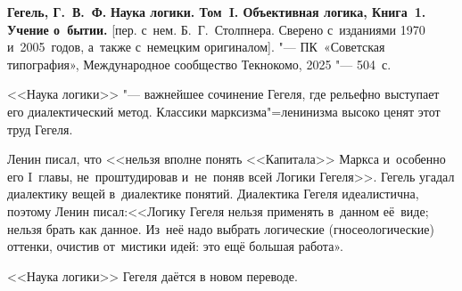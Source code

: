 \documentclass[a5paper, 10pt, twoside, onecolumn, openany]{memoir}
\begin{document}
\clearpage
\thispagestyle{bookoutput}
{\small
\noindent\textbf{Гегель, Г.~В.~Ф.}\newline
\textbf{Наука логики. Том~I. Объективная логика, Книга~1. Учение о~бытии.}
[пер. с~нем. Б.~Г.~Столпнера. Сверено с~изданиями 1970 и~2005~годов, а~также
с~немецким оригиналом]. "--- ПК~«Советская типография», Международное
сообщество Текнокомо, 2025 "--- 504~с.\vspace{2ex}

{\setlength\parskip{0mm}
<<Наука логики>> "--- важнейшее сочинение Гегеля, где рельефно выступает его
диалектический метод. Классики марксизма"=ленинизма высоко ценят этот труд
Гегеля.

Ленин писал, что <<нельзя вполне понять <<Капитала>> Маркса и~особенно его
I~главы, не~проштудировав и~не~поняв всей Логики Гегеля>>. Гегель угадал
диалектику вещей в~диалектике понятий. Диалектика Гегеля идеалистична, поэтому
Ленин писал:<<Логику Гегеля нельзя применять в~данном её~виде; нельзя брать как
данное. Из~неё надо выбрать логические (гносеологические) оттенки, очистив
от~мистики идей: это ещё большая работа».

<<Наука логики>> Гегеля даётся в новом переводе.}}
\vfil
\end{document}
